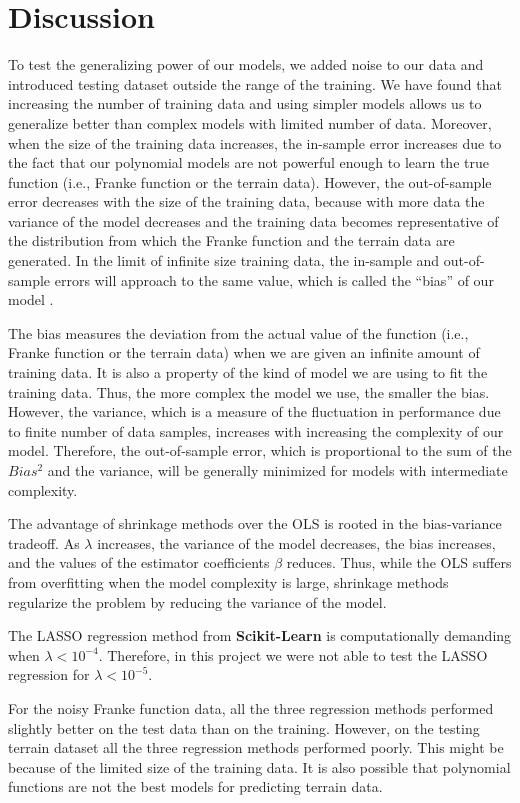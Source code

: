 \documentclass[a4paper]{article}
\begin{document}
\section{Discussion}
To test the generalizing power of our models, we added noise to our data and introduced testing dataset outside the range of the training. We have found that increasing the number of training data and using simpler models allows us to generalize better than complex models with limited number of data. Moreover, when the size of the training data increases, the in-sample error increases due to the fact that our polynomial models are not powerful enough to learn the true function (i.e., Franke function or the terrain data). However, the out-of-sample error decreases with the size of the training data, because with more data the variance of the model decreases and the training data becomes representative of the distribution from which the Franke function and the terrain data are generated. In the limit of infinite size training data, the in-sample and out-of-sample errors will approach to the same value, which is called the “bias” of our model \cite{Pankaj}.

The bias measures the deviation from the actual value of the function (i.e., Franke function or the terrain data) when we are given an infinite amount of training data. It is also a property of the kind of model we are using to fit the training data. Thus, the more complex the model we use, the smaller the bias. However, the variance, which is a measure of the fluctuation in performance due to finite number of data samples, increases with increasing the complexity of our model. Therefore, the out-of-sample error, which is proportional to the sum of the $Bias^2$ and the variance, will be generally minimized for models with intermediate complexity.

The advantage of shrinkage methods over the OLS is rooted in the bias-variance tradeoff. As $\lambda$ increases, the variance of the model decreases, the bias increases, and the values of the estimator coefficients $\beta$ reduces. Thus, while the OLS suffers from overfitting when the model complexity is large, shrinkage methods regularize the problem by reducing the variance of the model.

The LASSO regression method from \textbf{Scikit-Learn} is computationally demanding when $\lambda < 10^{-4}$. Therefore, in this project we were not able to test the LASSO regression for $\lambda < 10^{-5}$.

For the noisy Franke function data, all the three regression methods performed slightly better on the test data than on the training. However, on the testing terrain dataset all the three regression methods performed poorly. This might be because of the limited size of the training data. It is also possible that polynomial functions are not the best models for predicting terrain data.
\end{document}
